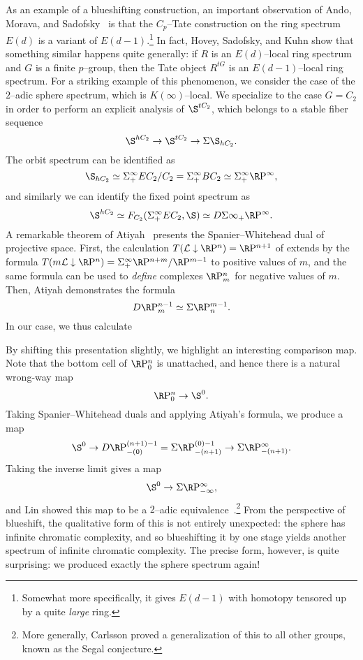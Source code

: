 As an example of a blueshifting construction, an important observation of Ando, Morava, and Sadofsky~\cite{AMS} is that the \(C_p\)--Tate construction on the ring spectrum \(E(d)\) is a variant of \(E(d-1)\).\footnote{Somewhat more specifically, it gives \(E(d-1)\) with homotopy tensored up by a quite \emph{large} ring.}  In fact, Hovey, Sadofsky, and Kuhn show that something similar happens quite generally: if \(R\) is an \(E(d)\)--local ring spectrum and \(G\) is a finite \(p\)--group, then the Tate object \(R^{tG}\) is an \(E(d-1)\)--local ring spectrum.  For a striking example of this phenomenon, we consider the case of the \(2\)--adic sphere spectrum, which is \(K(\infty)\)--local.  We specialize to the case \(G = C_2\) in order to perform an explicit analysis of \(\S^{tC_2}\), which belongs to a stable fiber sequence \[\S^{hC_2} \to \S^{tC_2} \to \Susp \S_{hC_2}.\]  The orbit spectrum can be identified as \[\S_{hC_2} \simeq \Susp^\infty_+ EC_2 / C_2 = \Susp^\infty_+ BC_2 \simeq \Susp^\infty_+ \RP^\infty,\] and similarly we can identify the fixed point spectrum as \[\S^{hC_2} \simeq F_{C_2}(\Susp^\infty_+ EC_2, \S) \simeq D\Susp\infty_+ \RP^\infty.\]  A remarkable theorem of Atiyah~\cite{Atiyah} presents the Spanier--Whitehead dual of projective space.  First, the calculation \(T(\mathcal L \downarrow \RP^n) = \RP^{n+1}\) of  extends by the formula \(T(m \mathcal L \downarrow \RP^n) = \Susp^\infty_+ \RP^{n+m} / \RP^{m-1}\) to positive values of \(m\), and the same formula can be used to \emph{define} complexes \(\RP^n_m\) for negative values of \(m\).  Then, Atiyah demonstrates the formula \[D \RP^{n-1}_m \simeq \Susp \RP^{m-1}_n.\]  In our case, we thus calculate
\begin{center}
\end{center}
By shifting this presentation slightly, we highlight an interesting comparison map.  Note that the bottom cell of \(\RP^n_0\) is unattached, and hence there is a natural wrong-way map \[\RP^n_0 \to \S^0.\]  Taking Spanier--Whitehead duals and applying Atiyah's formula, we produce a map \[\S^0 \to D \RP^{(n+1)-1}_{-(0)} = \Susp \RP^{(0)-1}_{-(n+1)} \to \Susp \RP^\infty_{-(n+1)}.\]  Taking the inverse limit gives a map \[\S^0 \to \Susp \RP^\infty_{-\infty},\] and Lin showed this map to be a \(2\)--adic equivalence~\cite{Lin}.\footnote{More generally, Carlsson proved a generalization of this to all other groups, known as the Segal conjecture.}  From the perspective of blueshift, the qualitative form of this is not entirely unexpected: the sphere has infinite chromatic complexity, and so blueshifting it by one stage yields another spectrum of infinite chromatic complexity.  The precise form, however, is quite surprising: we produced exactly the sphere spectrum again!

